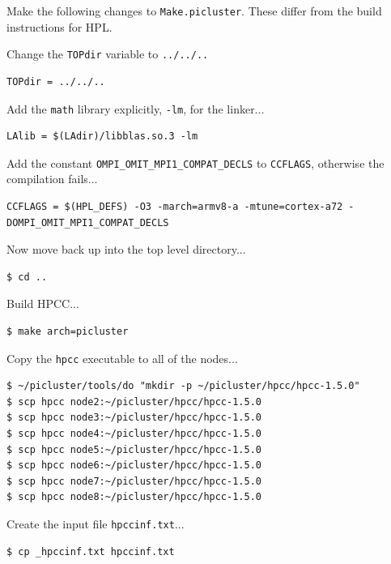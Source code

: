 \documentclass{report}
\begin{document}
Make the following changes to \verb|Make.picluster|. These differ from the build instructions for HPL.

Change the \verb|TOPdir| variable to \verb|../../..|

\lstset{style=hack}
\begin{lstlisting}[caption=Make.picluster]
TOPdir = ../../..
\end{lstlisting}

Add the \verb|math| library explicitly, \verb|-lm|, for the linker...

\lstset{style=hack}
\begin{lstlisting}[caption=Make.picluster]
LAlib = $(LAdir)/libblas.so.3 -lm
\end{lstlisting}

Add the constant \verb|OMPI_OMIT_MPI1_COMPAT_DECLS| to \verb|CCFLAGS|, otherwise the compilation fails...

\lstset{style=hack}
\begin{lstlisting}[caption=Make.picluster]
CCFLAGS = $(HPL_DEFS) -O3 -march=armv8-a -mtune=cortex-a72 -DOMPI_OMIT_MPI1_COMPAT_DECLS
\end{lstlisting}

Now move back up into the top level directory...

\lstset{style=termstyle}
\begin{lstlisting}
$ cd ..
\end{lstlisting}

Build HPCC...

\lstset{style=termstyle}
\begin{lstlisting}
$ make arch=picluster
\end{lstlisting}

Copy the \verb|hpcc| executable to all of the nodes...

\lstset{style=termstyle}
\begin{lstlisting}
$ ~/picluster/tools/do "mkdir -p ~/picluster/hpcc/hpcc-1.5.0"
$ scp hpcc node2:~/picluster/hpcc/hpcc-1.5.0
$ scp hpcc node3:~/picluster/hpcc/hpcc-1.5.0
$ scp hpcc node4:~/picluster/hpcc/hpcc-1.5.0
$ scp hpcc node5:~/picluster/hpcc/hpcc-1.5.0
$ scp hpcc node6:~/picluster/hpcc/hpcc-1.5.0
$ scp hpcc node7:~/picluster/hpcc/hpcc-1.5.0
$ scp hpcc node8:~/picluster/hpcc/hpcc-1.5.0
\end{lstlisting}

Create the input file \verb|hpccinf.txt|...

\lstset{style=termstyle}
\begin{lstlisting}
$ cp _hpccinf.txt hpccinf.txt
\end{lstlisting}
\end{document}
